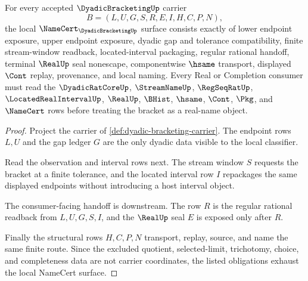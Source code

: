 \begin{theorem}
\label{thm:dyadic-bracketing-namecert-obligations}
For every accepted $\DyadicBracketingUp$ carrier
$$
B=(L,U,G,S,R,E,I,H,C,P,N),
$$
the local $\NameCert_{\DyadicBracketingUp}$ surface consists exactly of lower endpoint exposure, upper endpoint exposure, dyadic gap and tolerance compatibility, finite stream-window readback, located-interval packaging, regular rational handoff, terminal $\RealUp$ seal nonescape, componentwise $\hsame$ transport, displayed $\Cont$ replay, provenance, and local naming. Every Real or Completion consumer must read the $\DyadicRatCoreUp$, $\StreamNameUp$, $\RegSeqRatUp$, $\LocatedRealIntervalUp$, $\RealUp$, $\BHist$, $\hsame$, $\Cont$, $\Pkg$, and $\NameCert$ rows before treating the bracket as a real-name object.
\end{theorem}
\begin{proof}
Project the carrier of \autoref{def:dyadic-bracketing-carrier}. The endpoint rows $L,U$ and the gap ledger $G$ are the only dyadic data visible to the local classifier.

Read the observation and interval rows next. The stream window $S$ requests the bracket at a finite tolerance, and the located interval row $I$ repackages the same displayed endpoints without introducing a host interval object.

The consumer-facing handoff is downstream. The row $R$ is the regular rational readback from $L,U,G,S,I$, and the $\RealUp$ seal $E$ is exposed only after $R$.

Finally the structural rows $H,C,P,N$ transport, replay, source, and name the same finite route. Since the excluded quotient, selected-limit, trichotomy, choice, and completeness data are not carrier coordinates, the listed obligations exhaust the local NameCert surface.
\end{proof}

